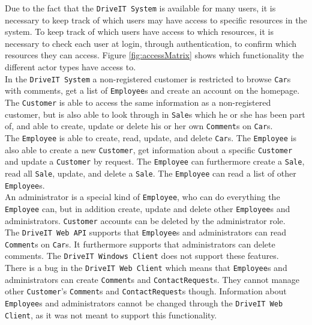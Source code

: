 Due to the fact that the \texttt{DriveIT System} is available for many users, it is necessary to keep track of which users may have access to specific resources in the system. To keep track of which users have access to which resources, it is necessary to check each user at login, through authentication, to confirm which resources they can access. Figure \ref{fig:accessMatrix} shows which functionality the different actor types have access to.\\

In the \texttt{DriveIT System} a non-registered customer is restricted to browse \texttt{Car}s with comments, get a list of \texttt{Employee}s and create an account on the homepage.\\

The \texttt{Customer} is able to access the same information as a non-registered customer, but is also able to look through in \texttt{Sale}s which he or she has been part of, and able to create, update or delete his or her own \texttt{Comment}s on \texttt{Car}s.\\

The \texttt{Employee} is able to create, read, update, and delete \texttt{Car}s. The \texttt{Employee} is also able to create a new \texttt{Customer}, get information about a specific \texttt{Customer} and update a \texttt{Customer} by request. The \texttt{Employee} can furthermore create a \texttt{Sale}, read all \texttt{Sale}, update, and delete a \texttt{Sale}. The \texttt{Employee} can read a list of other \texttt{Employee}s.\\

An administrator is a special kind of \texttt{Employee}, who can do everything the \texttt{Employee} can, but in addition create, update and delete other \texttt{Employee}s and administrators. \texttt{Customer} accounts can be deleted by the administrator role.\\

The \texttt{DriveIT Web API} supports that \texttt{Employee}s and administrators can read \texttt{Comment}s on \texttt{Car}s. It furthermore supports that administrators can delete comments. The \texttt{DriveIT Windows Client} does not support these features.\\

There is a bug in the \texttt{DriveIT Web Client} which means that \texttt{Employee}s and administrators can create \texttt{Comment}s and \texttt{ContactRequest}s. They cannot manage other \texttt{Customer}'s \texttt{Comment}s and \texttt{ContactRequest}s though. Information about \texttt{Employee}s and administrators cannot be changed through the \texttt{DriveIT Web Client}, as it was not meant to support this functionality.